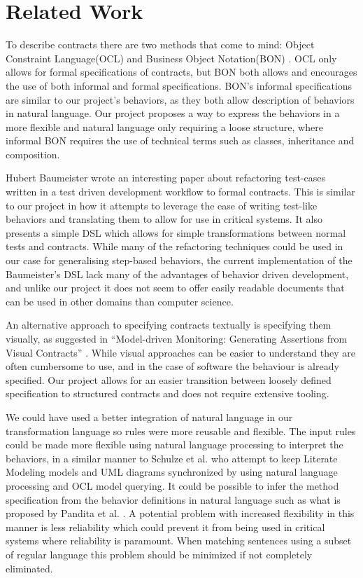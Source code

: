 \section{Related Work}
To describe contracts there are two methods that come to mind: Object Constraint Language(OCL) \cite{omg2010} and Business Object Notation(BON) \cite{walden1995}.
OCL only allows for formal specifications of contracts, but BON both allows and encourages the use of both informal and formal specifications.
BON's informal specifications are similar to our project's behaviors, as they both allow description of behaviors in natural language.
Our project proposes a way to express the behaviors in a more flexible and natural language only requiring a loose structure, where informal BON requires the use of technical terms such as classes, inheritance and composition.

Hubert Baumeister wrote an interesting paper \cite{baumeister2004} about refactoring test-cases written in a test driven development workflow to formal contracts.
This is similar to our project in how it attempts to leverage the ease of writing test-like behaviors and translating them to allow for use in critical systems.
It also presents a simple DSL which allows for simple transformations between normal tests and contracts.
While many of the refactoring techniques could be used in our case for generalising step-based behaviors, the current implementation of the Baumeister’s DSL lack many of the advantages of behavior driven development, and unlike our project it does not seem to offer easily readable documents that can be used in other domains than computer science.

An alternative approach to specifying contracts textually is specifying them visually, as suggested in ``Model-driven Monitoring: Generating Assertions from Visual Contracts'' \cite{lohmann2006}. While visual approaches can be easier to understand they are often cumbersome to use, and in the case of software the behaviour is already specified.
Our project allows for an easier transition between loosely defined specification to structured contracts and does not require extensive tooling.

We could have used a better integration of natural language in our transformation language so rules were more reusable and flexible. 
The input rules could be made more flexible using natural language processing to interpret the behaviors, in a similar manner to Schulze et al. \cite{schulze2012} who attempt to keep Literate Modeling models and UML diagrams synchronized by using natural language processing and OCL model querying.
It could be possible to infer the method specification from the behavior definitions in natural language such as what is proposed by Pandita et al. \cite{pandita2012}.
A potential problem with increased flexibility in this manner is less reliability which could prevent it from being used in critical systems where reliability is paramount.
When matching sentences using a subset of regular language this problem should be minimized if not completely eliminated.